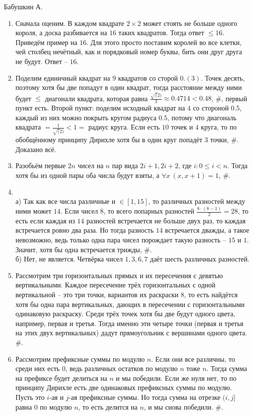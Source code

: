 \documentclass[12pt]{article}
\begin{document}
Бабушкин А.

\begin{enumerate}
	\setlength{\parskip}{0pt} 
	\setlength{\itemsep}{0pt} 
	\item Сначала оценим. В каждом квадрате $2 \times 2$ может стоять не больше одного короля, а доска разбивается на $16$ таких квадратов. Тогда ответ $\le 16$. Приведём пример на $16$. Для этого просто поставим королей во все клетки, чей столбец нечётный, как и порядковый номер буквы, бить они друг друга не будут. Ответ -- $16$. \\
	\item Поделим единичный квадрат на $9$ квадратов со сторой $0.(3)$. Точек десять, поэтому хотя бы две попадут в один квадрат, тогда расстояние между ними будет $\le$ диагонали квадрата, которая равна $\frac{\sqrt(2)}{3}  \approx 0.4714 < 0.48$, \#, первый пункт есть. Второй пункт: поделим исходный квадрат на $4$ со стороной $0.5$, каждый из них можно покрыть кругом радиуса $0.5$, потому что диагональ квадрата $= \frac{1}{\sqrt(2)} < 1 =$ радиус круга. Если есть $10$ точек и $4$ круга, то по обобщённому принципу Дирихле хотя бы в один круг попадёт $3$ точки, \#. Доказано всё. \\
	\item Разобьём первые $2n$ чисел на $n$ пар вида $2i + 1, 2i + 2$, где $i : 0 \le i < n$. Тогда хотя бы из одной пары оба числа будут взяты, а $\forall x~(x, x + 1) = 1$, \#.\\
	\item ~\\
	а) Так как все числа различные и $\in [1, 15]$, то различных разностей между ними может $14$. Если чисел $8$, то всего попарных разностей $\frac{8\cdot(8 - 1)}{2} = 28$, то есть если каждая из $14$ разностей встречается не больше двух раз, то каждая встречается ровно два раза. Но тогда разность $14$ встречается дважды, а такое невозможно, ведь только одна пара чисел порождает такую разность -- $15$ и $1$. Значит, хотя бы одна встречается трижды, \#. \\
	б) Нет, не является. Четвёрка чисел $1, 3, 6, 7$ даёт шесть различных разностей. \\
	\item Рассмотрим три горизонтальных прямых и их пересечения с девятью вертикальными. Каждое пересечение трёх горизонтальных с одной вертикальной -- это три точки, вариантов их раскраски $8$, то есть найдётся хотя бы одна пара вертикальных, дающих в пересечении с горизонтальными одинаковую раскраску. Среди трёх точек хотя бы две будут одного цвета, например, первая и третья. Тогда именно эти четыре точки (первая и третья на этих двух вертикальных) дадут прямоугольник с вершинами одного цвета. \#.  \\
	\item Рассмотрим префиксные суммы по модулю $n$. Если они все различны, то среди них есть $0$, ведь различных остатков по модулю $n$ тоже $n$. Тогда сумма на префиксе будет делиться на $n$ и мы победили. Если же нуля нет, то по принципу Дирихле есть две одинаковых префиксных суммы по модулю. Пусть это $i$-ая и $j$-ая префиксные суммы. Но тогда сумма на отрезке $(i, j]$ равна $0$ по модулю $n$, то есть делится на $n$, и мы снова победили. \#.
\end{enumerate}
\end{document}
